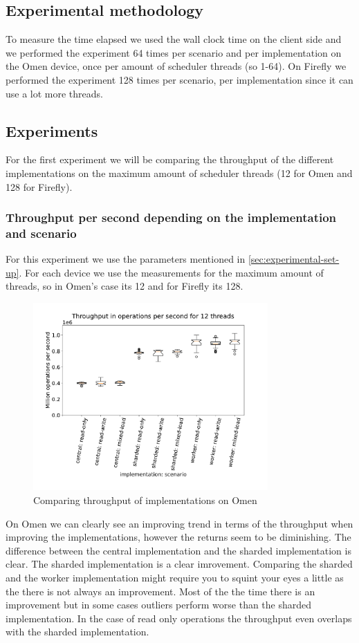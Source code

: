 \documentclass{article}
\begin{document}
\subsection{Experimental methodology}
To measure the time elapsed we used the wall clock time on the client side and we performed the
experiment 64 times per scenario and per implementation on the Omen device, once
per amount of scheduler threads (so 1-64). On Firefly we performed the
experiment 128 times per scenario, per implementation since it can use a lot
more threads.
\subsection{Experiments}
For the first experiment we will be comparing the throughput of the different
implementations on the maximum amount of scheduler threads (12 for Omen and 128
for Firefly).
\subsubsection{Throughput per second depending on the implementation and
	scenario}
For this experiment we use the parameters mentioned in
\autoref{sec:experimental-set-up}. For each device we use the measurements for
the maximum amount of threads, so in Omen's case its 12 and for Firefly its 128.
\begin{figure}[H]
	\centering
	\includegraphics[width=0.8\textwidth]{boxplots/omen/boxplot-throughput-in-operations-per-second-for-12-threads.pdf}
	\caption{Comparing throughput of implementations on Omen}
	\label{fig:throughput-compare-impl-omen}
\end{figure}
On Omen we can clearly see an improving trend in terms of the throughput when
improving the implementations, however the returns seem to be diminishing. The
difference between the central implementation and the sharded implementation is
clear. The sharded implementation is a clear imrovement. Comparing the sharded
and the worker implementation might require you to squint your eyes a little as
the there is not always an improvement. Most of the the time there is an
improvement but in some cases outliers perform worse than the sharded
implementation. In the case of read only operations the throughput even overlaps
with the sharded implementation.
\end{document}
